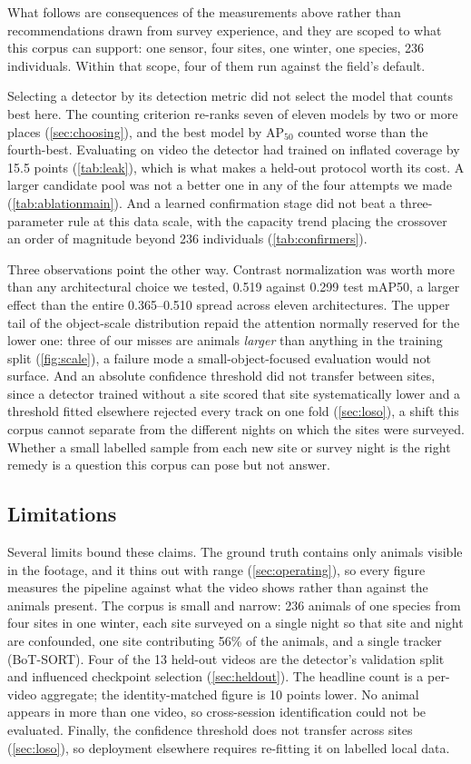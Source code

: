 What follows are consequences of the measurements above rather than recommendations drawn
from survey experience, and they are scoped to what this corpus can support: one sensor, four
sites, one winter, one species, 236 individuals. Within that scope, four of them run against
the field's default.

Selecting a detector by its detection metric did not select the model that counts best here.
The counting criterion re-ranks seven of eleven models by two or more places
(\cref{sec:choosing}), and the best model by AP$_{50}$ counted worse than the fourth-best.
Evaluating on video the detector had trained on inflated coverage by 15.5 points
(\cref{tab:leak}), which is what makes a held-out protocol worth its cost. A larger candidate
pool was not a better one in any of the four attempts we made (\cref{tab:ablationmain}). And a learned confirmation stage did not beat a three-parameter rule at this data scale, with the capacity
trend placing the crossover an order of magnitude beyond 236 individuals
(\cref{tab:confirmers}).

Three observations point the other way. Contrast normalization was worth more than any
architectural choice we tested, 0.519 against 0.299 test mAP50, a larger effect than the entire 0.365--0.510 spread across eleven architectures. The upper tail of the object-scale
distribution repaid the attention normally reserved for the lower one: three of our misses are
animals \emph{larger} than anything in the training split (\cref{fig:scale}), a failure mode a
small-object-focused evaluation would not surface. And an absolute confidence threshold did not
transfer between sites, since a detector trained without a site scored that site systematically lower and a threshold
fitted elsewhere rejected every track on one fold (\cref{sec:loso}), a shift this corpus cannot
separate from the different nights on which the sites were surveyed.
Whether a small labelled sample from each new site or survey night is the right remedy is a question this
corpus can pose but not answer.

\subsection{Limitations}
\label{sec:limitations}

Several limits bound these claims. The ground truth contains only animals visible in the
footage, and it thins out with range (\cref{sec:operating}), so every figure measures the
pipeline against what the video shows rather than against the animals present. The corpus is
small and narrow: 236 animals of one species from four sites in one winter, each site
surveyed on a single night so that site and night are confounded, one site contributing
56\% of the animals, and a single tracker (BoT-SORT). Four of the 13 held-out videos are the
detector's validation split and influenced checkpoint selection (\cref{sec:heldout}). The
headline count is a per-video aggregate; the identity-matched figure is 10 points lower. No
animal appears in more than one video, so cross-session identification could not be
evaluated. Finally, the confidence threshold does not transfer across sites
(\cref{sec:loso}), so deployment elsewhere requires re-fitting it on labelled local data.
